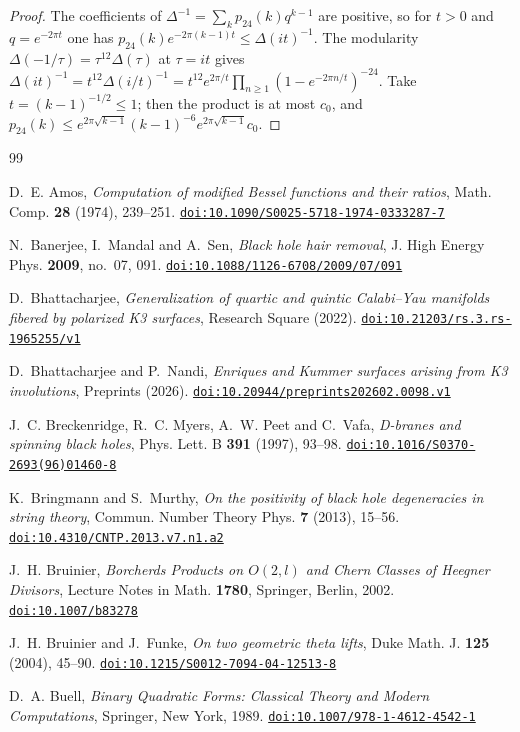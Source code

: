 \documentclass[11pt]{amsart}
\theoremstyle{definition}
\newcommand{\pf}{p_{24}}
\newcommand{\doi}[1]{\href{https://doi.org/#1}{\nolinkurl{doi:#1}}}
\begin{document}
\begin{proof}
The coefficients of $\Delta^{-1}=\sum_k\pf(k)q^{k-1}$ are positive, so for $t>0$ and $q=e^{-2\pi t}$ one has $\pf(k)e^{-2\pi(k-1)t}\le\Delta(it)^{-1}$. The modularity $\Delta(-1/\tau)=\tau^{12}\Delta(\tau)$ at $\tau=it$ gives $\Delta(it)^{-1}=t^{12}\Delta(i/t)^{-1}=t^{12}e^{2\pi/t}\prod_{n\ge1}(1-e^{-2\pi n/t})^{-24}$. Take $t=(k-1)^{-1/2}\le1$; then the product is at most $c_0$, and $\pf(k)\le e^{2\pi\sqrt{k-1}}(k-1)^{-6}e^{2\pi\sqrt{k-1}}c_0$.
\end{proof}

\begin{thebibliography}{99}\small

 D.~E. Amos, \emph{Computation of modified Bessel functions and their ratios}, Math. Comp. \textbf{28} (1974), 239--251. \doi{10.1090/S0025-5718-1974-0333287-7}

 N.~Banerjee, I.~Mandal and A.~Sen, \emph{Black hole hair removal}, J. High Energy Phys. \textbf{2009}, no.~07, 091. \doi{10.1088/1126-6708/2009/07/091}

 D.~Bhattacharjee, \emph{Generalization of quartic and quintic Calabi--Yau manifolds fibered by polarized K3 surfaces}, Research Square (2022). \doi{10.21203/rs.3.rs-1965255/v1}

 D.~Bhattacharjee and P.~Nandi, \emph{Enriques and Kummer surfaces arising from K3 involutions}, Preprints (2026). \doi{10.20944/preprints202602.0098.v1}

 J.~C. Breckenridge, R.~C. Myers, A.~W. Peet and C.~Vafa, \emph{D-branes and spinning black holes}, Phys. Lett. B \textbf{391} (1997), 93--98. \doi{10.1016/S0370-2693(96)01460-8}

 K.~Bringmann and S.~Murthy, \emph{On the positivity of black hole degeneracies in string theory}, Commun. Number Theory Phys. \textbf{7} (2013), 15--56. \doi{10.4310/CNTP.2013.v7.n1.a2}

 J.~H. Bruinier, \emph{Borcherds Products on $O(2,l)$ and Chern Classes of Heegner Divisors}, Lecture Notes in Math. \textbf{1780}, Springer, Berlin, 2002. \doi{10.1007/b83278}

 J.~H. Bruinier and J.~Funke, \emph{On two geometric theta lifts}, Duke Math. J. \textbf{125} (2004), 45--90. \doi{10.1215/S0012-7094-04-12513-8}

 D.~A. Buell, \emph{Binary Quadratic Forms: Classical Theory and Modern Computations}, Springer, New York, 1989. \doi{10.1007/978-1-4612-4542-1}


\end{thebibliography}
\end{document}
